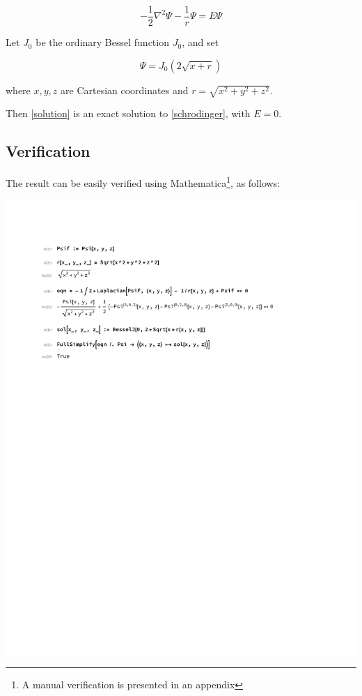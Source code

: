 \documentclass{article}
\begin{document}
\begin{equation}
\label{schrodinger}
-\frac{1}{2}\nabla^2 \Psi - \frac{1}{r}\Psi = E \Psi
\end{equation}

Let $J_0$ be the ordinary Bessel function $J_0$, and set

\begin{equation}
\label{solution}
\Psi = J_0(2\sqrt{x+r})
\end{equation}

where $x,y,z$ are Cartesian coordinates and $r=\sqrt{x^2+y^2+z^2}$.

\vskip 12pt

Then \eqref{solution} is an exact solution to \eqref{schrodinger}, with $E=0$.

\subsection*{Verification}

The result can be easily verified using Mathematica\footnote{A manual verification is presented in an appendix}, as follows:

\includegraphics[page=1, clip, trim=1in 7in 1in 1in, width=\textwidth]{improved.pdf}
\end{document}
